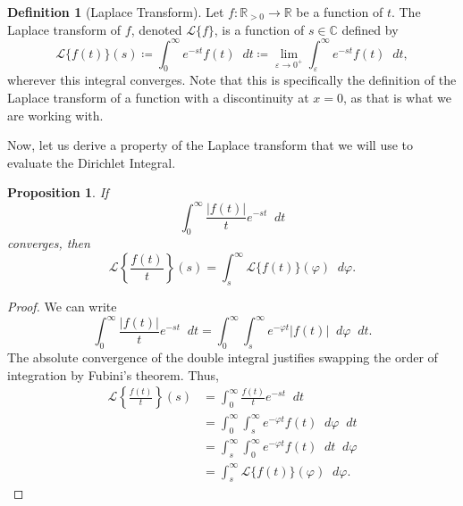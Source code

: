 \documentclass[a4paper]{article}
\newcommand*\diff{\mathop{}\!d} %
\newtheorem{proposition}[theorem]{Proposition}
\theoremstyle{definition}
\newtheorem{definition}{Definition}
\begin{document}
\begin{definition}[Laplace Transform]
    Let $f: \mathbb{R}_{>0} \to \mathbb{R}$ be a function of $t$.
    The Laplace transform of $f$, denoted $\mathscr{L}\{f\}$, is a function of $s \in \mathbb{C}$ defined by
    \begin{equation}
        \mathscr{L} \{f(t)\}(s) \coloneq \int_{0}^{\infty} e^{-st} f(t) \diff t \coloneq \lim_{\varepsilon \to 0^+} \int_{\varepsilon}^{\infty} e^{-st} f(t) \diff t,
    \end{equation}
    wherever this integral converges.
    Note that this is specifically the definition of the Laplace transform of a function with a discontinuity at $x=0$, as that is what we are working with.
\end{definition}
Now, let us derive a property of the Laplace transform that we will use to evaluate the Dirichlet Integral.
\begin{proposition} \label{thm:Laplace property proposition}
    If
    \begin{equation*}
        \int_{0}^{\infty} \frac{|f(t)|}{t} e^{-st} \diff t
    \end{equation*}
    converges, then
    \begin{equation}
        \mathscr{L} \left\{\frac{f(t)}{t}\right\}(s) = \int_{s}^{\infty} \mathscr{L}\{f(t)\}(\varphi) \diff \varphi.
    \end{equation}
\end{proposition}
\begin{proof}
    We can write
    \begin{equation*}
        \int_{0}^{\infty} \frac{|f(t)|}{t} e^{-st} \diff t = \int_{0}^{\infty} \int_{s}^{\infty} e^{-\varphi t} |f(t)| \diff \varphi \diff t.
    \end{equation*}
    The absolute convergence of the double integral justifies swapping the order of integration by Fubini's theorem.
    Thus,
    \begin{align*}
        \mathscr{L} \left\{\frac{f(t)}{t}\right\}(s) & = \int_{0}^{\infty} \frac{f(t)}{t} e^{-st} \diff t                              \\
                                                     & = \int_{0}^{\infty} \int_{s}^{\infty} e^{-\varphi t} f(t) \diff \varphi \diff t \\
                                                     & = \int_{s}^{\infty} \int_{0}^{\infty} e^{-\varphi t} f(t) \diff t \diff \varphi \\
                                                     & = \int_{s}^{\infty} \mathscr{L}\{f(t)\}(\varphi) \diff \varphi.
    \end{align*}
\end{proof}
\end{document}
